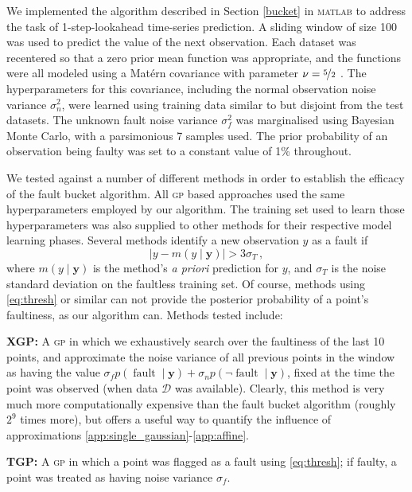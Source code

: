 \documentclass{article} %
\newcommand{\given}{\!\ensuremath{\mid}\!}
\newcommand{\cm}[1]{\ensuremath{\mathcal{#1}}}
\newcommand{\bm}[1]{\ensuremath{\mathbf{#1}}}
\newcommand{\data}{\ensuremath{\cm{D}}}
\newcommand{\acro}[1]{\textsc{#1}}
\newcommand{\vect}[1]{\bm{#1}}
\newcommand{\vy}{\vect{y}}
\newcommand{\p}[2]{p(#1\given#2)}
\newcommand{\mean}[2]{{m}(#1\given#2)}
\DeclareMathOperator{\fault}{fault}
\begin{document}
We implemented the algorithm described in Section \ref{bucket} in
\textsc{matlab} to address the task of 1-step-lookahead time-series
prediction.  A sliding window of size 100 was used to predict the
value of the next observation.  Each dataset was recentered so that a
zero prior mean function was appropriate, and the functions were all
modeled using a Mat\'{e}rn covariance with parameter $\nu =
\nicefrac{5}{2}$ \citep{gpml}.  The hyperparameters for this
covariance, including the normal observation noise variance
$\sigma_n^2$, were learned using training data similar to but disjoint from the test datasets.  The unknown fault noise variance $\sigma_f^2$
was marginalised using Bayesian Monte Carlo, with a parsimonious 7 samples used.  The prior probability of an observation being faulty was
set to a constant value of 1\% throughout.

We tested against a number of different methods in order to establish the efficacy of the fault bucket algorithm. All \acro{gp} based approaches used the same hyperparameters employed by our algorithm. The training set used to learn those hyperparameters was also supplied to other methods for their respective model learning phases. Several methods identify a new observation $y$ as a fault if
\begin{equation}\label{eq:thresh}
 |y-\mean{y}{\vy}|>3\sigma_T\,,
\end{equation}
where $\mean{y}{\vy}$ is the method's \emph{a priori} prediction for $y$, and $\sigma_T$ is the noise standard deviation on the faultless training set. Of course, methods using \eqref{eq:thresh} or similar can not provide the posterior probability of a point's faultiness, as our algorithm can. Methods tested include:

{\bf XGP:}
A  \acro{gp} in which we exhaustively search over the faultiness of the last 10 points, and approximate the noise variance of all previous points in the window as having the value $\sigma_f \p{\fault}{\vy} + \sigma_n \p{\neg\fault}{\vy}$, fixed at the time the point was observed (when data $\data$ was available). Clearly, this method is very much more computationally expensive than the fault bucket algorithm (roughly $2^9$ times more), but offers a useful way to quantify the influence of approximations \ref{app:single_gaussian}-\ref{app:affine}.

{\bf TGP:}
A \acro{gp} in which a point was flagged as a fault using \eqref{eq:thresh}; if faulty, a point was treated as having noise variance $\sigma_f$.
\end{document}
